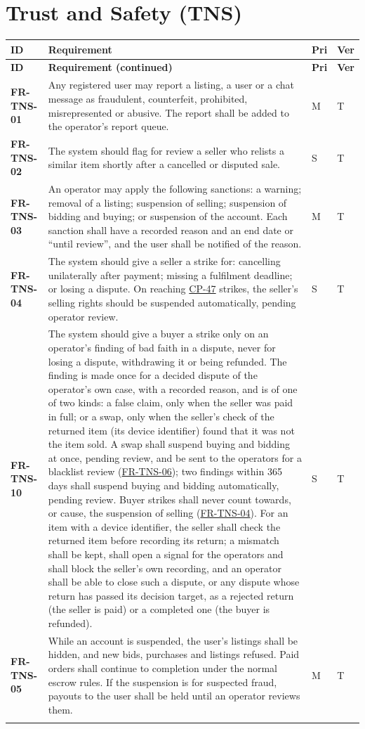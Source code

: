 \documentclass[11pt,a4paper]{report}
\makeatletter
\newenvironment{reqs}{%
  \small
  \begin{longtable}{@{}>{\raggedright\arraybackslash}p{2.35cm}
                       >{\raggedright\arraybackslash}p{10.3cm}
                       >{\centering\arraybackslash}p{0.7cm}
                       >{\centering\arraybackslash}p{0.7cm}@{}}
  \toprule
  \textbf{ID} & \textbf{Requirement} & \textbf{Pri} & \textbf{Ver} \\
  \midrule
  \endfirsthead
  \toprule
  \textbf{ID} & \textbf{Requirement (continued)} & \textbf{Pri} & \textbf{Ver} \\
  \midrule
  \endhead
  \bottomrule
  \endfoot
}{\end{longtable}}
\newcommand{\req}[5]{\leavevmode\textbf{#1}\hypertarget{#1}{} & #5 & #2 & #3 \\ \addlinespace[2pt]}
\newcommand{\rr}[1]{\hyperlink{#1}{#1}}
\newcommand{\cp}[1]{\hyperlink{#1}{#1}}
\makeatother
\begin{document}
\section{Trust and Safety (TNS)}
\begin{reqs}
\req{FR-TNS-01}{M}{T}{FR-87}{Any registered user may report a listing, a user or a chat message as fraudulent, counterfeit, prohibited, misrepresented or abusive. The report shall be added to the operator's report queue.}
\req{FR-TNS-02}{S}{T}{FR-89}{The system should flag for review a seller who relists a similar item shortly after a cancelled or disputed sale.}
\req{FR-TNS-03}{M}{T}{new}{An operator may apply the following sanctions: a warning; removal of a listing; suspension of selling; suspension of bidding and buying; or suspension of the account. Each sanction shall have a recorded reason and an end date or ``until review'', and the user shall be notified of the reason.}
\req{FR-TNS-04}{S}{T}{new}{The system should give a seller a strike for: cancelling unilaterally after payment; missing a fulfilment deadline; or losing a dispute. On reaching \cp{CP-47} strikes, the seller's selling rights should be suspended automatically, pending operator review.}
\req{FR-TNS-10}{S}{T}{new}{The system should give a buyer a strike only on an operator's finding of bad faith in a dispute, never for losing a dispute, withdrawing it or being refunded. The finding is made once for a decided dispute of the operator's own case, with a recorded reason, and is of one of two kinds: a false claim, only when the seller was paid in full; or a swap, only when the seller's check of the returned item (its device identifier) found that it was not the item sold. A swap shall suspend buying and bidding at once, pending review, and be sent to the operators for a blacklist review (\rr{FR-TNS-06}); two findings within 365 days shall suspend buying and bidding automatically, pending review. Buyer strikes shall never count towards, or cause, the suspension of selling (\rr{FR-TNS-04}). For an item with a device identifier, the seller shall check the returned item before recording its return; a mismatch shall be kept, shall open a signal for the operators and shall block the seller's own recording, and an operator shall be able to close such a dispute, or any dispute whose return has passed its decision target, as a rejected return (the seller is paid) or a completed one (the buyer is refunded).}
\req{FR-TNS-05}{M}{T}{new}{While an account is suspended, the user's listings shall be hidden, and new bids, purchases and listings refused. Paid orders shall continue to completion under the normal escrow rules. If the suspension is for suspected fraud, payouts to the user shall be held until an operator reviews them.}

\end{reqs}
\end{document}
